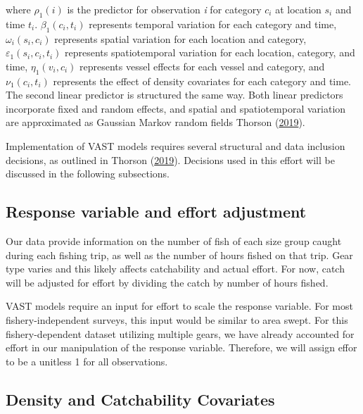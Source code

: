 \documentclass[
]{article}
\begin{document}
where \(\rho_1(i)\) is the predictor for observation \emph{i} for category \(c_i\) at location \(s_i\) and time \(t_i\). \(\beta_1(c_i, t_i)\) represents temporal variation for each category and time, \(\omega_i(s_i, c_i)\) represents spatial variation for each location and category, \(\varepsilon_1(s_i, c_i, t_i)\) represents spatiotemporal variation for each location, category, and time, \(\eta_1(v_i, c_i)\) represents vessel effects for each vessel and category, and \(\nu_1(c_i, t_i)\) represents the effect of density covariates for each category and time. The second linear predictor is structured the same way. Both linear predictors incorporate fixed and random effects, and spatial and spatiotemporal variation are approximated as Gaussian Markov random fields Thorson (\protect\hyperlink{ref-thorson_2019}{2019}).

Implementation of VAST models requires several structural and data inclusion decisions, as outlined in Thorson (\protect\hyperlink{ref-thorson_2019}{2019}). Decisions used in this effort will be discussed in the following subsections.

\hypertarget{response-variable-and-effort-adjustment}{%
\subsection{Response variable and effort adjustment}\label{response-variable-and-effort-adjustment}}

Our data provide information on the number of fish of each size group caught during each fishing trip, as well as the number of hours fished on that trip. Gear type varies and this likely affects catchability and actual effort. For now, catch will be adjusted for effort by dividing the catch by number of hours fished.

VAST models require an input for effort to scale the response variable. For most fishery-independent surveys, this input would be similar to area swept. For this fishery-dependent dataset utilizing multiple gears, we have already accounted for effort in our manipulation of the response variable. Therefore, we will assign effor to be a unitless 1 for all observations.

\hypertarget{density-and-catchability-covariates}{%
\subsection{Density and Catchability Covariates}\label{density-and-catchability-covariates}}
\end{document}
